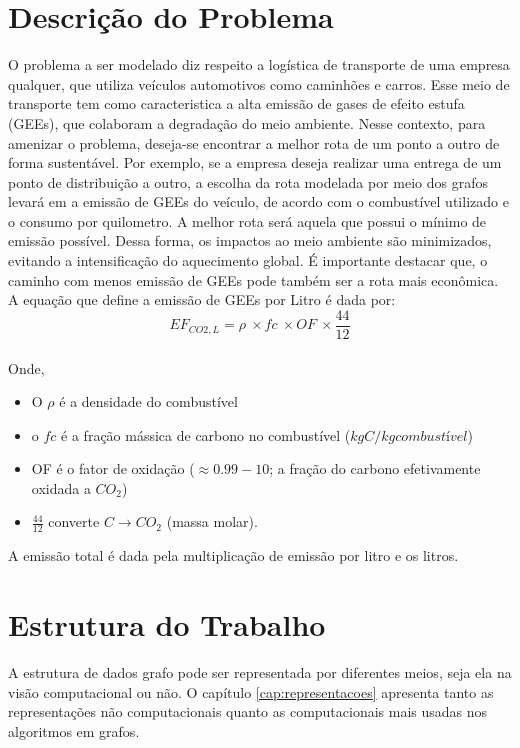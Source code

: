 	\section{Descrição do Problema}\label{sec:descGrafo}
	O problema a ser modelado diz respeito a logística de transporte de uma
	empresa qualquer, que utiliza veículos automotivos como caminhões e carros. Esse meio de transporte tem como caracteristica a alta emissão de gases de efeito estufa (GEEs), que colaboram a degradação do meio ambiente. Nesse
	contexto, para amenizar o problema, deseja-se encontrar a melhor rota de um
	ponto a outro de forma sustentável. Por exemplo, se a empresa deseja realizar
	uma entrega de um ponto de distribuição a outro, a escolha da rota modelada por
	meio dos grafos levará em a emissão de GEEs do veículo, de acordo com o combustível utilizado e o consumo por quilometro. A melhor rota
	será aquela que possui o mínimo de emissão possível. Dessa forma, os impactos ao meio ambiente são minimizados,
	evitando a intensificação do aquecimento global. É importante destacar que, o caminho com menos emissão de GEEs pode também ser a rota mais econômica. A equação que define a emissão de GEEs por Litro é dada por:
	\begin{equation}
		EF_{CO2,L}=\rho\ \times fc\ \times OF\ \times\frac{44}{12} 
	\end{equation}
	\\
	Onde,
	\begin{itemize}
		\item O $\rho$ é  a densidade do combustível
		\item o $fc$ é a fração mássica de carbono no combustível ($kgC/kg combustível$)
		\item OF é o fator de oxidação ($\approx 0.99 - 10$; a fração do carbono efetivamente oxidada a $CO_2$)
		\item $\frac{44}{12}$  converte $C \rightarrow CO_2$ (massa molar). 
	\end{itemize}
	A emissão total é dada pela multiplicação de emissão por litro e os litros.
	
	\section{Estrutura do Trabalho}\label{sec:estruturaTrabalho}
	A estrutura de dados grafo pode ser representada por diferentes meios, seja ela na visão computacional ou não. O capítulo \ref{cap:representacoes} apresenta tanto as representações não computacionais quanto as computacionais mais usadas nos algoritmos em grafos.
	
